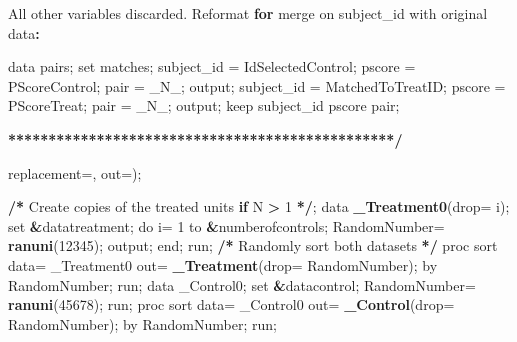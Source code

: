 \documentclass[]{article}
\newenvironment{Shaded}{\begin{snugshade}}{\end{snugshade}}
\newcommand{\KeywordTok}[1]{\textcolor[rgb]{0.13,0.29,0.53}{\textbf{#1}}}
\newcommand{\DataTypeTok}[1]{\textcolor[rgb]{0.13,0.29,0.53}{#1}}
\newcommand{\DecValTok}[1]{\textcolor[rgb]{0.00,0.00,0.81}{#1}}
\newcommand{\StringTok}[1]{\textcolor[rgb]{0.31,0.60,0.02}{#1}}
\newcommand{\ControlFlowTok}[1]{\textcolor[rgb]{0.13,0.29,0.53}{\textbf{#1}}}
\newcommand{\OperatorTok}[1]{\textcolor[rgb]{0.81,0.36,0.00}{\textbf{#1}}}
\newcommand{\ErrorTok}[1]{\textcolor[rgb]{0.64,0.00,0.00}{\textbf{#1}}}
\newcommand{\NormalTok}[1]{#1}
\begin{document}
\begin{Shaded}
\begin{Highlighting}[]
{\NormalTok{All other variables discarded.   Reformat }\ControlFlowTok{for}\NormalTok{ merge on subject_id with original data}\OperatorTok{:}

\StringTok{  }\NormalTok{data pairs;}
\NormalTok{    set  matches;}
\NormalTok{    subject_id =}\StringTok{ }\NormalTok{IdSelectedControl; pscore =}\StringTok{ }\NormalTok{PScoreControl; pair =}\StringTok{ }\NormalTok{_N_;}
\NormalTok{    output;}
\NormalTok{    subject_id =}\StringTok{ }\NormalTok{MatchedToTreatID; pscore =}\StringTok{ }\NormalTok{PScoreTreat; pair =}\StringTok{ }\NormalTok{_N_;}
\NormalTok{    output;}
\NormalTok{    keep subject_id pscore pair;}


\OperatorTok{**}\ErrorTok{**********************************************/}

\NormalTok{%macro }\KeywordTok{PSMatching}\NormalTok{(}\DataTypeTok{datatreatment=}\NormalTok{, }\DataTypeTok{datacontrol=}\NormalTok{, }\DataTypeTok{method=}\NormalTok{, }\DataTypeTok{numberofcontrols=}\NormalTok{, }\DataTypeTok{caliper=}\NormalTok{,}
 \DataTypeTok{replacement=}\NormalTok{, }\DataTypeTok{out=}\NormalTok{);}

\OperatorTok{/}\ErrorTok{*}\StringTok{ }\NormalTok{Create copies of the treated units }\ControlFlowTok{if}\NormalTok{ N }\OperatorTok{>}\StringTok{ }\DecValTok{1} \OperatorTok{*}\ErrorTok{/}\NormalTok{;}
\NormalTok{ data }\KeywordTok{_Treatment0}\NormalTok{(}\DataTypeTok{drop=}\NormalTok{ i);}
\NormalTok{  set }\OperatorTok{&}\NormalTok{datatreatment;}
\NormalTok{  do i=}\StringTok{ }\DecValTok{1}\NormalTok{ to }\OperatorTok{&}\NormalTok{numberofcontrols;}
\NormalTok{  RandomNumber=}\StringTok{ }\KeywordTok{ranuni}\NormalTok{(}\DecValTok{12345}\NormalTok{);}
\NormalTok{output;}
\NormalTok{end;}
\NormalTok{run;}
\OperatorTok{/}\ErrorTok{*}\StringTok{ }\NormalTok{Randomly sort both datasets }\OperatorTok{*}\ErrorTok{/}
\NormalTok{proc sort data=}\StringTok{ }\NormalTok{_Treatment0 out=}\StringTok{ }\KeywordTok{_Treatment}\NormalTok{(}\DataTypeTok{drop=}\NormalTok{ RandomNumber);}
\NormalTok{by RandomNumber;}
\NormalTok{run;}
\NormalTok{data _Control0;}
\NormalTok{set }\OperatorTok{&}\NormalTok{datacontrol;}
\NormalTok{RandomNumber=}\StringTok{ }\KeywordTok{ranuni}\NormalTok{(}\DecValTok{45678}\NormalTok{);}
\NormalTok{run;}
\NormalTok{proc sort data=}\StringTok{ }\NormalTok{_Control0 out=}\StringTok{ }\KeywordTok{_Control}\NormalTok{(}\DataTypeTok{drop=}\NormalTok{ RandomNumber);}
\NormalTok{by RandomNumber;}
\NormalTok{run;}

}}
\end{Highlighting}
\end{Shaded}
\end{document}
